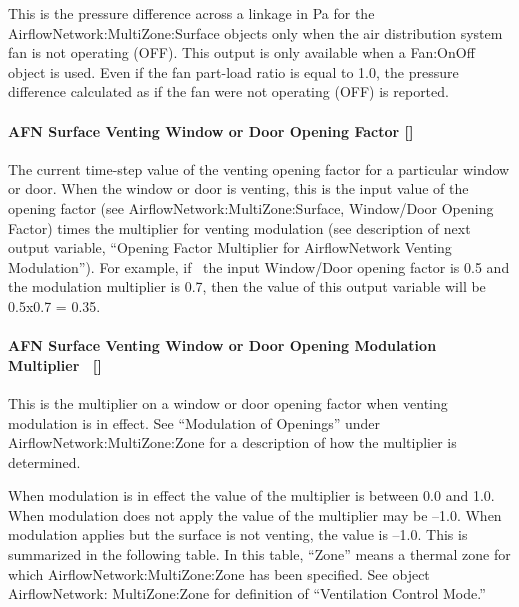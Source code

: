 This is the pressure difference across a linkage in Pa for the AirflowNetwork:MultiZone:Surface objects only when the air distribution system fan is not operating (OFF). This output is only available when a Fan:OnOff object is used. Even if the fan part-load ratio is equal to 1.0, the pressure difference calculated as if the fan were not operating (OFF) is reported.

\paragraph{AFN Surface Venting Window or Door Opening Factor {[]}}\label{afn-surface-venting-window-or-door-opening-factor}

The current time-step value of the venting opening factor for a particular window or door. When the window or door is venting, this is the input value of the opening factor (see AirflowNetwork:MultiZone:Surface, Window/Door Opening Factor) times the multiplier for venting modulation (see description of next output variable, ``Opening Factor Multiplier for AirflowNetwork Venting Modulation''). For example, if~ the input Window/Door opening factor is 0.5 and the modulation multiplier is 0.7, then the value of this output variable will be 0.5x0.7 = 0.35.

\paragraph{AFN Surface Venting Window or Door Opening Modulation Multiplier~ {[]}}\label{afn-surface-venting-window-or-door-opening-modulation-multiplier}

This is the multiplier on a window or door opening factor when venting modulation is in effect. See ``Modulation of Openings'' under AirflowNetwork:MultiZone:Zone for a description of how the multiplier is determined.

When modulation is in effect the value of the multiplier is between 0.0 and 1.0. When modulation does not apply the value of the multiplier may be --1.0. When modulation applies but the surface is not venting, the value is --1.0. This is summarized in the following table. In this table, ``Zone'' means a thermal zone for which AirflowNetwork:MultiZone:Zone has been specified. See object AirflowNetwork: MultiZone:Zone for definition of ``Ventilation Control Mode.''

